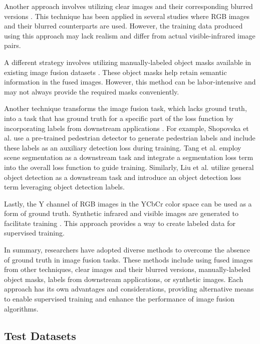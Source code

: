 Another approach involves utilizing clear images and their corresponding blurred versions \cite{zhang2020ifcnn, liu2018infrared, wang2019generative, feng2020fully, luo2021ifsepr, zhu2022iplf}. This technique has been applied in several studies where RGB images and their blurred counterparts are used. However, the training data produced using this approach may lack realism and differ from actual visible-infrared image pairs.

A different strategy involves utilizing manually-labeled object masks available in existing image fusion datasets \cite{ma2021stdfusionnet}. These object masks help retain semantic information in the fused images. However, this method can be labor-intensive and may not always provide the required masks conveniently.

Another technique transforms the image fusion task, which lacks ground truth, into a task that has ground truth for a specific part of the loss function by incorporating labels from downstream applications \cite{shopovska2019deep, tang2022image, liu2022target}. For example, Shopovska et al. \cite{shopovska2019deep} use a pre-trained pedestrian detector to generate pedestrian labels and include these labels as an auxiliary detection loss during training. Tang et al. \cite{tang2022image} employ scene segmentation as a downstream task and integrate a segmentation loss term into the overall loss function to guide training. Similarly, Liu et al. \cite{liu2022target} utilize general object detection as a downstream task and introduce an object detection loss term leveraging object detection labels.

Lastly, the Y channel of RGB images in the YCbCr color space can be used as a form of ground truth. Synthetic infrared and visible images are generated to facilitate training \cite{luo2021latraivf}. This approach provides a way to create labeled data for supervised training.

In summary, researchers have adopted diverse methods to overcome the absence of ground truth in image fusion tasks. These methods include using fused images from other techniques, clear images and their blurred versions, manually-labeled object masks, labels from downstream applications, or synthetic images. Each approach has its own advantages and considerations, providing alternative means to enable supervised training and enhance the performance of image fusion algorithms.

\subsection{Test Datasets}

